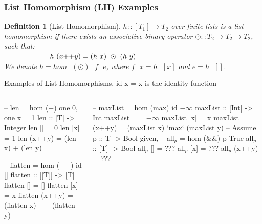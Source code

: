 \documentclass{beamer}
\renewcommand{\emph}[1]{\textcolor{structure}{#1}}
\newcommand{\emp}[1]{\textcolor{DikuRed}{ #1}}
\newcommand{\mymath}[1]{$ #1 $}
\newcommand{\myindx}[1]{_{#1}}
\newtheorem{mydef}{Definition}
\begin{document}
\begin{frame}[fragile,t]
  \frametitle{List Homomorphism (LH) Examples}


\begin{mydef}[List Homomorphism]\label{LHomDef}
$h :: [T_1] \rightarrow T_2$ over finite lists is a {\em list homomorphism}
if there exists an associative binary operator $\odot :: T_2 \rightarrow T_2 \rightarrow T_2$,
such that: \\
$\mbox{ }\mbox{ }\mbox{ }\mbox{ }\mbox{ }\mbox{ }\mbox{ }\mbox{ }\mbox{ }$
\emp{$h \mbox{ } (x{\tt ++}y) = (h\mbox{ }x)\mbox{ }\odot\mbox{ }(h\mbox{ }y)$} \\
We denote $h = hom \mbox{ }(\odot) \mbox{ }f\mbox{ }e$, where $f\mbox{ }x = h\mbox{ }[x]$ and $e = h\mbox{ }[]$. 
\end{mydef}

\begin{block}{Examples of List Homomorphisms, id x = x is the identity function}
\vspace{-2ex}
\begin{columns}
\begin{colorcode}[fontsize=\scriptsize]
-- \emp{len} = \emp{hom (+) one 0}, one x = 1
len :: [T] -> Integer
len []     = \emp{0}
len [x]    = \emp{1}
\emph{len} (x++y) = (\emph{len} x) \emp{+} (\emph{len} y)

-- \emph{flatten} = \emp{hom (++) id []}
flatten :: [[T]] -> [T]
flatten []     = \emp{[]}
flatten [x]    = \emp{x}
\emph{flatten} (x++y) = (\emph{flatten} x) \emp{++} 
                 (\emph{flatten} y)
\end{colorcode}
\begin{colorcode}[fontsize=\scriptsize]
-- \emph{maxList} = \emp{hom (max) id \mymath{-\infty}} 
maxList :: [Int] -> Int
maxList []     = \emp{\mymath{-\infty}}
maxList [x]    = \emp{x}
\emph{maxList} (x++y) = (\emph{maxList} x) \emp{`max`} 
                 (\emph{maxList} y)
-- Assume p :: T -> Bool given,
-- \emph{all\mymath{\myindx{p}}} = \emp{hom (&&) p True}
all\mymath{\myindx{p}} :: [T] -> Bool
all\mymath{\myindx{p}} []     = \alert{???}
all\mymath{\myindx{p}} [x]    = \alert{???} 
\emph{all\mymath{\myindx{p}}} (x++y) = \alert{???}
\end{colorcode}
\end{columns}
\end{block}



\end{frame}
\end{document}
